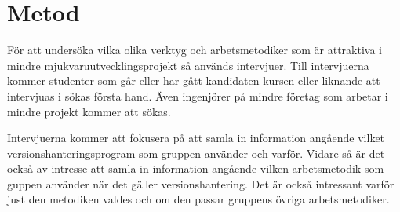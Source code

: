 \section{Metod}
För att undersöka vilka olika verktyg och arbetsmetodiker som är attraktiva i mindre mjukvaruutvecklingsprojekt så används intervjuer. Till intervjuerna kommer studenter som går eller har gått kandidaten kursen eller liknande att intervjuas i sökas första hand. Även ingenjörer på mindre företag som arbetar i mindre projekt kommer att sökas.


Intervjuerna kommer att fokusera på att samla in information angående vilket versionshanteringsprogram som gruppen använder och varför. Vidare så är det också av intresse att samla in information angående vilken arbetsmetodik som guppen använder när det gäller versionshantering. Det är också intressant varför just den metodiken valdes och om den passar gruppens övriga arbetsmetodiker.

